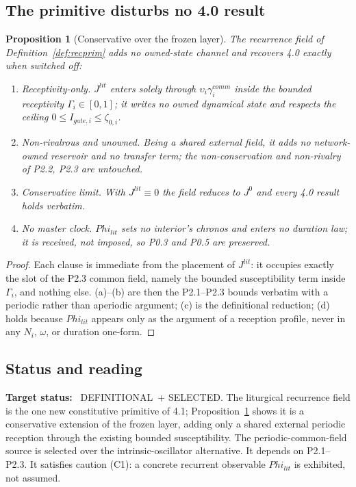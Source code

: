 \documentclass[11pt,a4paper]{article}
\def\Phi{Phi}%
\def\mathrm#1{#1}%
\def\emph#1{#1}%
\newcommand{\stDef}{\textcolor{cDef}{\textsf{\small DEFINITIONAL}}}
\newcommand{\stSelected}{\textcolor{cSel}{\textsf{\small SELECTED}}}
\theoremstyle{definition}
\theoremstyle{plain}
\newtheorem{proposition}[definition]{Proposition}
\theoremstyle{remark}
\begin{document}
\subsection{The primitive disturbs no 4.0 result}

\begin{proposition}[Conservative over the frozen layer]\label{prop:phi0cons}
The recurrence field of Definition~\ref{def:recprim} adds no owned-state channel and recovers
4.0 exactly when switched off:
\begin{enumerate}[label=\textup{(\alph*)},leftmargin=1.2cm]
\item \emph{Receptivity-only.} \(J^{\mathrm{lit}}\) enters solely through
\(\upsilon_i\gamma_i^{\mathrm{comm}}\) inside the bounded receptivity \(\Gamma_i\in[0,1]\);
it writes no owned dynamical state and respects the ceiling
\(0\le I_{\mathrm{gate},i}\le\zeta_{0,i}\).
\item \emph{Non-rivalrous and unowned.} Being a shared external field, it adds no
network-owned reservoir and no transfer term; the non-conservation and non-rivalry of P2.2,
P2.3 are untouched.
\item \emph{Conservative limit.} With \(J^{\mathrm{lit}}\equiv0\) the field reduces to
\(J^0\) and every 4.0 result holds verbatim.
\item \emph{No master clock.} \(\Phi_{\mathrm{lit}}\) sets no interior's chronos and enters no
duration law; it is received, not imposed, so P0.3 and P0.5 are preserved.
\end{enumerate}
\end{proposition}

\begin{proof}
Each clause is immediate from the placement of \(J^{\mathrm{lit}}\): it occupies exactly the
slot of the P2.3 common field, namely the bounded susceptibility term inside \(\Gamma_i\),
and nothing else. (a)--(b) are then the P2.1--P2.3 bounds verbatim with a periodic rather than
aperiodic argument; (c) is the definitional reduction; (d) holds because \(\Phi_{\mathrm{lit}}\)
appears only as the argument of a reception profile, never in any \(N_i\), \(\omega\), or
duration one-form. \qedhere
\end{proof}

\subsection{Status and reading}

\textbf{Target status:}~
\stDef\ + \stSelected. The liturgical recurrence field is the one new constitutive primitive
of 4.1; Proposition~\ref{prop:phi0cons} shows it is a conservative extension of the frozen
layer, adding only a shared external periodic reception through the existing bounded
susceptibility. The periodic-common-field source is \emph{selected} over the intrinsic-oscillator
alternative. It depends on P2.1--P2.3. It satisfies caution (C1): a concrete recurrent
observable \(\Phi_{\mathrm{lit}}\) is exhibited, not assumed.
\end{document}
